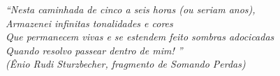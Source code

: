 \begin{epigrafe}
    \vspace*{\fill}
	\begin{flushright}

		\textit{``Nesta caminhada de cinco a seis horas (ou seriam anos),\\
					Armazenei infinitas tonalidades e cores\\
					Que permanecem vivas e se estendem feito sombras adocicadas\\
					Quando resolvo passear dentro de mim! ''\\
					(Ênio Rudi Sturzbecher, fragmento de Somando Perdas)}
	\end{flushright}
\end{epigrafe}
